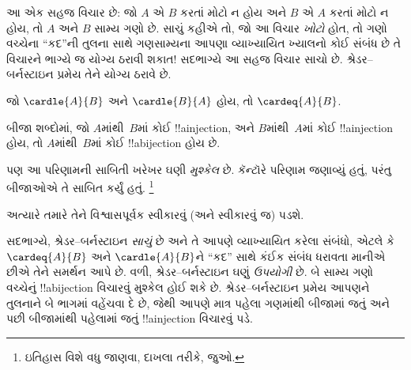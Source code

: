 \documentclass[../../../include/open-logic-section]{subfiles}
\begin{document}


\begin{explain}
આ એક સહજ વિચાર છે: જો $A$ એ $B$ કરતાં મોટો ન હોય અને $B$ એ
$A$ કરતાં મોટો ન હોય, તો $A$ અને $B$ સામ્ય ગણો છે. સાચું કહીએ તો,
જો આ વિચાર \emph{ખોટો} હોત, તો ગણો વચ્ચેના “કદ”ની તુલના સાથે
ગણસામ્યના આપણા વ્યાખ્યાયિત ખ્યાલનો કોઈ સંબંધ છે તે વિચારને ભાગ્યે જ
યોગ્ય ઠરાવી શકાત!{} સદભાગ્યે આ સહજ વિચાર સાચો છે. શ્રેડર--બર્નસ્ટાઇન
પ્રમેય તેને યોગ્ય ઠરાવે છે.
\end{explain}

\begin{thm}[શ્રેડર--બર્નસ્ટાઇન]
	જો $\cardle{A}{B}$ અને $\cardle{B}{A}$ હોય,
	તો $\cardeq{A}{B}$.
\end{thm}

\begin{explain}
બીજા શબ્દોમાં, જો $A$માંથી~$B$માં કોઈ !!a{injection}, અને
$B$માંથી~$A$માં કોઈ !!a{injection} હોય, તો $A$માંથી~$B$માં
કોઈ !!a{bijection} હોય છે.

પણ આ પરિણામની સાબિતી ખરેખર ઘણી \emph{મુશ્કેલ} છે. કૅન્ટૉરે
પરિણામ જણાવ્યું હતું, પરંતુ બીજાઓએ તે સાબિત કર્યું હતું.
\footnote{ઇતિહાસ વિશે વધુ જાણવા, દાખલા તરીકે,
\citet[pp.~165--6]{Potter2004} જુઓ.}
%

અત્યારે તમારે તેને વિશ્વાસપૂર્વક સ્વીકારવું (અને સ્વીકારવું જ) પડશે.

સદભાગ્યે, શ્રેડર--બર્નસ્ટાઇન \emph{સાચું} છે અને તે આપણે વ્યાખ્યાયિત
કરેલા સંબંધો, એટલે કે $\cardeq{A}{B}$ અને $\cardle{A}{B}$ને “કદ”
સાથે કંઈક સંબંધ ધરાવતા માનીએ છીએ તેને સમર્થન આપે છે. વળી,
શ્રેડર--બર્નસ્ટાઇન ઘણું \emph{ઉપયોગી} છે. બે સામ્ય ગણો વચ્ચેનું
!!a{bijection} વિચારવું મુશ્કેલ હોઈ શકે છે. શ્રેડર--બર્નસ્ટાઇન પ્રમેય
આપણને તુલનાને બે ભાગમાં વહેંચવા દે છે, જેથી આપણે માત્ર પહેલા ગણમાંથી
બીજામાં જતું અને પછી બીજામાંથી પહેલામાં જતું !!a{injection} વિચારવું પડે.
\end{explain}
\end{document}

